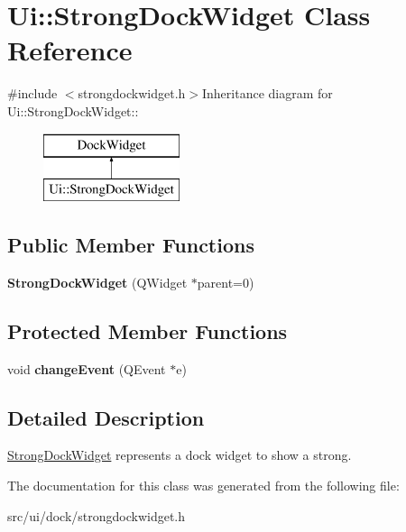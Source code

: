 \hypertarget{classUi_1_1StrongDockWidget}{
\section{Ui::StrongDockWidget Class Reference}
\label{classUi_1_1StrongDockWidget}
}


{\ttfamily \#include $<$strongdockwidget.h$>$}Inheritance diagram for Ui::StrongDockWidget::\begin{figure}[H]
\begin{center}
\leavevmode
\includegraphics[height=2cm]{classUi_1_1StrongDockWidget}
\end{center}
\end{figure}
\subsection*{Public Member Functions}
\begin{DoxyCompactItemize}
\item 
\hypertarget{classUi_1_1StrongDockWidget_af8cb5220eae7a93d449d5b6a72d2bd1a}{
{\bfseries StrongDockWidget} (QWidget $\ast$parent=0)}
\label{classUi_1_1StrongDockWidget_af8cb5220eae7a93d449d5b6a72d2bd1a}

\end{DoxyCompactItemize}
\subsection*{Protected Member Functions}
\begin{DoxyCompactItemize}
\item 
\hypertarget{classUi_1_1StrongDockWidget_a8b85dce4eba91133835221469c22455c}{
void {\bfseries changeEvent} (QEvent $\ast$e)}
\label{classUi_1_1StrongDockWidget_a8b85dce4eba91133835221469c22455c}

\end{DoxyCompactItemize}


\subsection{Detailed Description}
\hyperlink{classUi_1_1StrongDockWidget}{StrongDockWidget} represents a dock widget to show a strong. 

The documentation for this class was generated from the following file:\begin{DoxyCompactItemize}
\item 
src/ui/dock/strongdockwidget.h\end{DoxyCompactItemize}
